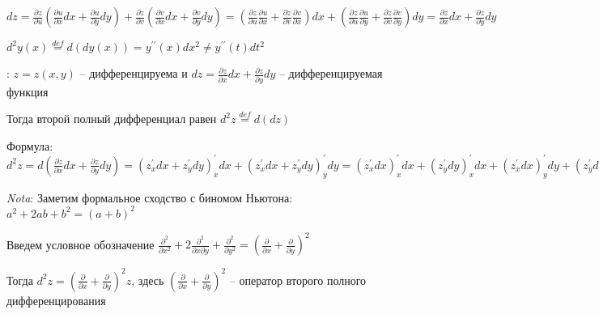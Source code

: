 \documentclass[12pt]{article}
\begin{document}
    \begin{MyProof}
        $\displaystyle dz = \frac{\partial z}{\partial u} \left(\frac{\partial u}{\partial x} dx + \frac{\partial u}{\partial y} dy\right) +
        \frac{\partial z}{\partial v} \left(\frac{\partial v}{\partial x} dx + \frac{\partial v}{\partial y} dy\right) =
        \left(\frac{\partial z}{\partial u} \frac{\partial u}{\partial x} + \frac{\partial z}{\partial v} \frac{\partial v}{\partial x}\right) dx +
        \left(\frac{\partial z}{\partial u} \frac{\partial u}{\partial y} + \frac{\partial z}{\partial v} \frac{\partial v}{\partial y}\right) dy =
        \frac{\partial z}{\partial x} dx + \frac{\partial z}{\partial y} dy$
    \end{MyProof}


    \Mem $\displaystyle d^2 y(x) \stackrel{def}{=} d(dy(x)) = y^{\prime\prime}(x) dx^2 \neq y^{\prime\prime}(t) dt^2$
    
    \Def: $\displaystyle z = z(x, y)$ -- дифференцируема и $\displaystyle dz = \frac{\partial z}{\partial x}dx + \frac{\partial z}{\partial y}dy$ -- дифференцируемая функция

    \hypertarget{seconddifferentialoffunctionoftwovariables}{}

    Тогда второй полный дифференциал равен $\displaystyle d^2 z \stackrel{def}{=} d(dz)$

    Формула: $\displaystyle d^2 z = d\left(\frac{\partial z}{\partial x}dx + \frac{\partial z}{\partial y}dy\right) = (z^\prime_x dx + z^\prime_y dy)^\prime_x dx + (z^\prime_x dx + z^\prime_y dy)^\prime_y dy =
    (z^\prime_x dx)^\prime_x dx + (z^\prime_y dy)^\prime_x dx + (z^\prime_x dx)^\prime_y dy + (z^\prime_y dy)^\prime_y dy =
    (z^\prime_x)^\prime_x (dx)^2 + (z^\prime_y)^\prime_x dxdy + (z^\prime_x)^\prime_y dydx + (z^\prime_y)^\prime_y (dy)^2 =
    \frac{\partial^2 z}{\partial x^2} (dx)^2 + 2 \frac{\partial^2 z}{\partial x \partial y} dxdy + \frac{\partial^2 z}{\partial y^2} (dy)^2$

    \textit{Nota}: Заметим формальное сходство с биномом Ньютона: $\displaystyle a^2 + 2ab + b^2 = (a + b)^2$

    Введем условное обозначение $\displaystyle \frac{\partial^2}{\partial x^2} + 2 \frac{\partial^2}{\partial x \partial y} + \frac{\partial^2}{\partial y^2} = \left(\frac{\partial}{\partial x} + \frac{\partial}{\partial y}\right)^2$

    Тогда $\displaystyle d^2 z = \left(\frac{\partial}{\partial x} + \frac{\partial}{\partial y}\right)^2 z$, здесь $\displaystyle \left(\frac{\partial}{\partial x} + \frac{\partial}{\partial y}\right)^2$ -- оператор второго полного дифференцирования
\end{document}
